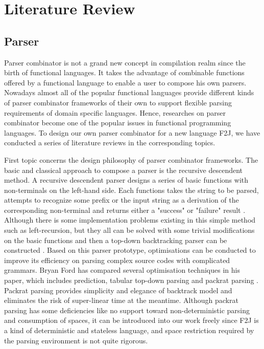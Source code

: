 \chapter{Literature Review}

\section{Parser}

Parser combinator is not a grand new concept in compilation realm since the birth of functional languages. It takes the advantage of combinable functions offered by a functional language to enable a user to compose his own parsers. Nowadays almost all of the popular functional languages provide different kinds of parser combinator frameworks of their own to support flexible parsing requirements of domain specific languages. Hence, researches on parser combinator become one of the popular issues in functional programming languages. To design our own parser combinator for a new language F2J, we have conducted a series of literature reviews in the corresponding topics.

First topic concerns the design philosophy of parser combinator frameworks. The basic and classical approach to compose a parser is the recursive descendent method. A recursive descendent parser designs a series of basic functions with non-terminals on the left-hand side. Each functions takes the string to be parsed, attempts to recognize some prefix or the input string as a derivation of the corresponding non-terminal and returns either a "success" or "failure" result \cite{Ford2002}. Although there is some implementation problems existing in this simple method such as left-recursion, but they all can be solved with some trivial modifications on the basic functions and then a top-down backtracking parser can be constructed \cite{Compilers:2006}. Based on this parser prototype, optimisations can be conducted to improve its efficiency on parsing complex source codes with complicated grammars. Bryan Ford has compared several optimisation techniques in his paper, which includes prediction, tabular top-down parsing and packrat parsing \cite{Ford2002}. Packrat parsing provides simplicity and elegance of backtrack model and eliminates the risk of super-linear time at the meantime. Although packrat parsing has some deficiencies like no support toward non-deterministic parsing and consumption of spaces, it can be introduced into our work freely since F2J is a kind of deterministic and stateless language, and space restriction required by the parsing environment is not quite rigorous.

